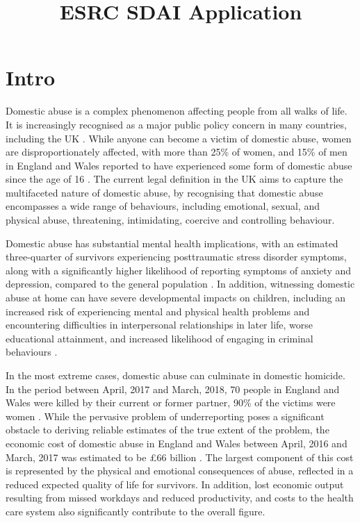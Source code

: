 \documentclass[12pt, letterpaper]{article}
\begin{document}
\title{ESRC SDAI Application}
\date{}
\maketitle

\section{Intro}

Domestic abuse is a complex phenomenon affecting people from all walks of life. It is increasingly recognised as a major public policy concern in many countries, including the UK \cite{ep}. While anyone can become a victim of domestic abuse, women are disproportionately affected, with more than 25\% of women, and 15\% of men in England and Wales reported to have experienced some form of domestic abuse since the age of 16 \cite{ONS}. The current legal definition in the UK \cite{govuk} aims to capture the multifaceted nature of domestic abuse, by recognising that domestic abuse encompasses a wide range of behaviours, including emotional, sexual, and physical abuse, threatening, intimidating, coercive and controlling behaviour. 

Domestic abuse has substantial mental health implications, with an estimated three-quarter of survivors experiencing posttraumatic stress disorder symptoms, along with a significantly higher likelihood of reporting symptoms of anxiety and depression, compared to the general population \cite{ferrari}. In addition, witnessing domestic abuse at home can have severe developmental impacts on children, including an increased risk of experiencing mental and physical health problems and encountering difficulties in interpersonal relationships in later life, worse educational attainment, and increased likelihood of engaging in criminal behaviours \cite{callaghan}.

In the most extreme cases, domestic abuse can culminate in domestic homicide. In the period between April, 2017 and March, 2018, 70 people in England and Wales were killed by their current or former partner, 90\% of the victims were women \cite{homic}. While the pervasive problem of underreporting poses a significant obstacle to deriving reliable estimates of the true extent of the problem, the economic cost of domestic abuse in England and Wales between April, 2016 and March, 2017 was estimated to be £66 billion \cite{costs}. The largest component of this cost is represented by the physical and emotional consequences of abuse, reflected in a reduced expected quality of life for survivors. In addition, lost economic output resulting from missed workdays and reduced productivity, and costs to the health care system also significantly contribute to the overall figure. 
\end{document}
